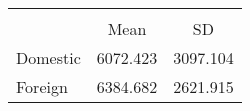 \begin{table}[htbp]\centering
\def\sym#1{\ifmmode^{#1}\else\(^{#1}\)\fi}
\begin{tabular} {l*{1}{cc}}
&\multicolumn{2}{c}{}     \\
& Mean & SD                            \\
Domestic &  6072.423 &  3097.104\\
Foreign &  6384.682 &  2621.915\\
\end{tabular}
\end{table}